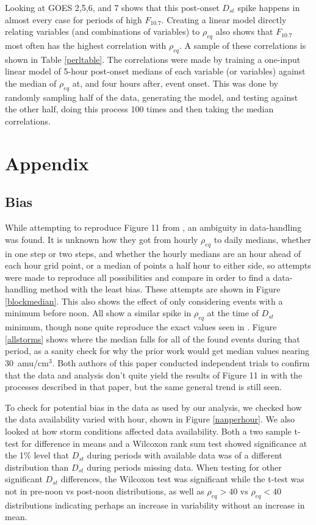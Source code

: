 \documentclass[10pt,twocolumn]{article}
\begin{document}
Looking at GOES 2,5,6, and 7 shows that this post-onset $D_{st}$ spike happens in almost every case for periods of high $F_{10.7}$. Creating a linear model directly relating variables (and combinations of variables) to $\rho_{eq}$ also shows that $F_{10.7}$ most often has the highest correlation with $\rho_{eq}$. A sample of these correlations is shown in Table \ref{perltable}. The correlations were made by training a one-input linear model of 5-hour post-onset medians of each variable (or variables) against the median of $\rho_{eq}$ at, and four hours after, event onset. This was done by randomly sampling half of the data, generating the model, and testing against the other half, doing this process 100 times and then taking the median correlations.




\section{Appendix}
\subsection{Bias}
While attempting to reproduce Figure 11 from \cite{Takahashi2010}, an ambiguity in data-handling was found. It is unknown how they got from hourly $\rho_{eq}$ to daily medians, whether in one step or two steps, and whether the hourly medians are an hour ahead of each hour grid point, or a median of points a half hour to either side, so attempts were made to reproduce all possibilities and compare in order to find a data-handling method with the least bias. These attempts are shown in Figure \ref{blockmedian}. This also shows the effect of only considering events with a minimum before noon. All show a similar spike in $\rho_{eq}$ at the time of $D_{st}$ minimum, though none quite reproduce the exact values seen in \cite{Takahashi2010}. Figure \ref{allstorms} shows where the median falls for all of the found events during that period, as a sanity check for why the prior work would get median values nearing $30$~amu/cm$^3$. Both authors of this paper conducted independent trials to confirm that the data and analysis don't quite yield the results of Figure 11 in \cite{Takahashi2010} with the processes described in that paper, but the same general trend is still seen. 

To check for potential bias in the data as used by our analysis, we checked how the data availability varied with hour, shown in Figure \ref{nanperhour}. We also looked at how storm conditions affected data availability. Both a two sample t-test for difference in means and a Wilcoxon rank sum test showed significance at the 1\% level that $D_{st}$ during periods with available data was of a different distribution than $D_{st}$ during periods missing data. When testing for other significant $D_{st}$ differences, the Wilcoxon test was significant while the t-test was not in pre-noon vs post-noon distributions, as well as $\rho_{eq}>40$ vs $\rho_{eq}<40$ distributions indicating perhaps an increase in variability without an increase in mean.
\end{document}
